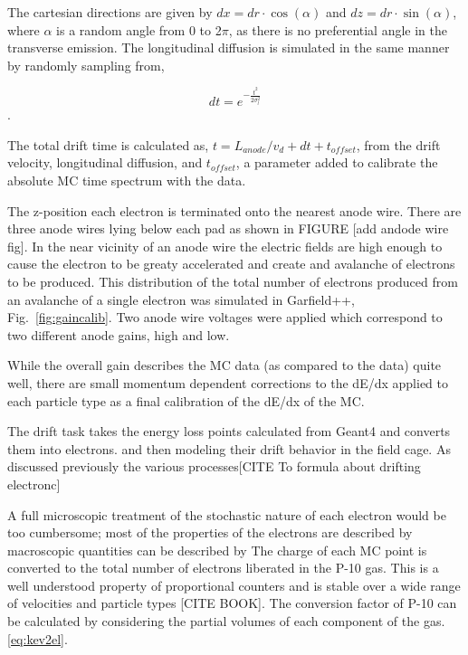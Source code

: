 The cartesian directions are given by $dx = dr \cdot \cos(\alpha)$ and $dz = dr \cdot \sin(\alpha)$, where $\alpha$ is a random angle from 0 to 2$\pi$, as there is no preferential angle in the transverse emission. The longitudinal diffusion is simulated in the same manner by randomly sampling from, 

\begin{equation}
dt = e^{-\frac{t^2}{2\sigma_{l}^2}}
\end{equation}.

 The total drift time is calculated as,
 $t = L_{anode}/v_d + dt + t_{offset}$, 
  from the drift velocity, longitudinal diffusion, and $t_{offset}$, a parameter added to calibrate the absolute MC time spectrum with the data. 

The z-position each electron is terminated onto the nearest anode wire. There are three anode wires lying below each pad as shown in FIGURE [add andode wire fig]. In the near vicinity of an anode wire the electric fields are high enough to cause the electron to be greaty accelerated and create and avalanche of electrons to be produced. This distribution of the total number of electrons produced from an avalanche of a single electron was simulated in Garfield++, Fig.~\ref{fig:gaincalib}. Two anode wire voltages were applied which correspond to two different anode gains, high and low. 

  
While the overall gain describes the MC data (as compared to the data) quite well, there are small momentum dependent corrections to the dE/dx applied to each particle type as a final calibration of the dE/dx of the MC. 









The drift task takes the energy loss points calculated from Geant4 and converts them into electrons.  and then modeling their drift behavior in the field cage. As discussed previously the various processes[CITE To formula about drifting electronc]


 A full microscopic treatment of the stochastic nature of each electron would be too cumbersome; most of the properties of the electrons are described by macroscopic quantities can be described by 
The charge of each MC point is converted to the total number of electrons liberated in the P-10 gas. This is a well understood property of proportional counters and is stable over a wide range of velocities and particle types [CITE BOOK]. The conversion factor of P-10 can be calculated by considering the partial volumes of each component of the gas.  \ref{eq:kev2el}.

